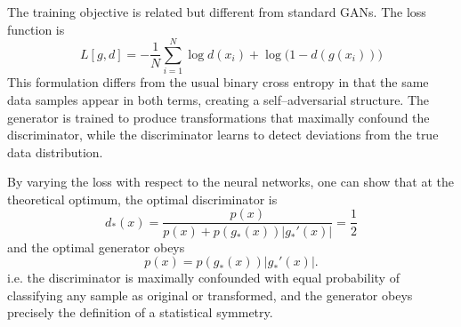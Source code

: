     The training objective is related but different from standard GANs.
    The loss function is
    \[
        L[g,d] = -\frac{1}{N}\sum_{i=1}^{N} \log d(x_i) + \log\big(1-d(g(x_i))\big)
    \]
    This formulation differs from the usual binary cross entropy in that the same data samples appear in both terms, creating a self--adversarial structure.
    The generator is trained to produce transformations that maximally confound the discriminator, while the discriminator learns to detect deviations from the true data distribution.

    By varying the loss with respect to the neural networks, one can show that at the theoretical optimum, the optimal discriminator is
    \[
        d_*(x) = \frac{p(x)}{p(x) + p(g_*(x))|g_*'(x)|} = \frac{1}{2}
    \]
    and the optimal generator obeys
    \[
        p(x) = p(g_*(x))|g_*'(x)|.
    \]
    i.e. the discriminator is maximally confounded with equal probability of classifying any sample as original or transformed, and the generator obeys precisely the definition of a statistical symmetry.

